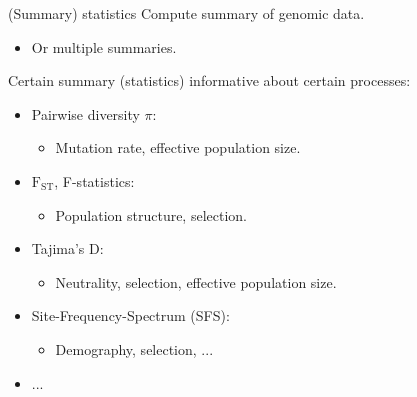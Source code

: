 \documentclass{beamer}
\newcommand{\1}{\ensuremath{\mathbf{1}}}
\begin{document}
\begin{frame}{(Summary) statistics}
    Compute summary of genomic data.
    \begin{itemize}
        \item Or multiple summaries.
    \end{itemize}
    \begin{block}{}
        Certain summary (statistics) informative about certain processes:
    \end{block}
    \begin{itemize}
        \item Pairwise diversity $\pi$:
        \begin{itemize}
            \item Mutation rate, effective population size.
        \end{itemize}
        \item $\text{F}_\text{ST}$, F-statistics:
        \begin{itemize}
            \item Population structure, selection.
        \end{itemize}
        \item Tajima's D:
        \begin{itemize}
            \item Neutrality, selection, effective population size.
        \end{itemize}
        \item Site-Frequency-Spectrum (SFS):
        \begin{itemize}
            \item Demography, selection, ...
        \end{itemize}
        \item ...
    \end{itemize}
\end{frame}
%
%
%
\end{document}
